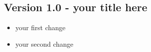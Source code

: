 \documentclass[10pt,a4paper]{article}
\begin{document}
\subsection{Version 1.0 - your title here}
\begin{itemize}
\item your first change
\item your second change
\end{itemize}
\date{January 1, 2000}
\end{document}
